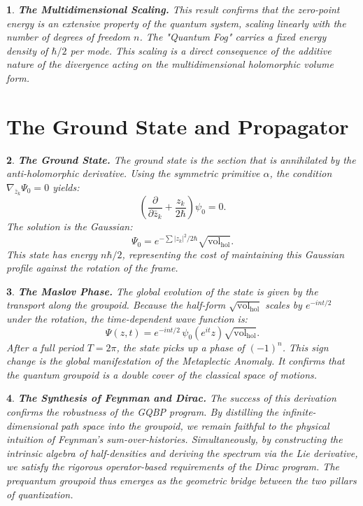\documentclass[11pt,reqno,letterpaper,twoside]{amsart}
\theoremstyle{articlestyle}
\newtheorem{article}{}
\theoremstyle{plain}
\theoremstyle{definition}
\def\artlabel[#1]{\textbf{#1.}}
\newcommand{\0}{\hat{0}}
\newcommand{\1}{\hat{1}}
\newcommand{\hol}{\mathrm{hol}}
\newcommand{\vol}{\mathrm{vol}}
\begin{document}
  \begin{article}\artlabel[The Multidimensional Scaling]
    This result confirms that the zero-point energy is an extensive property
    of the quantum system,
    scaling linearly with the number of degrees of freedom $n$.
    The "Quantum Fog" carries a fixed energy density of $\hbar/2$ per mode.
    This scaling is a direct consequence of the additive nature of the divergence 
    acting on the multidimensional holomorphic volume form.
  \end{article}
  
  
  \section{\textbf{The Ground State and Propagator}}
  \label{sec:GroundState}
  
  \begin{article}\artlabel[The Ground State]
    The ground state is the section that is annihilated by the anti-holomorphic derivative.
    Using the symmetric primitive $\alpha$, the condition $\nabla_{\bar{z}_k} \Psi_0 = 0$ yields:
    $$
      \left( \frac{\partial}{\partial \bar{z}_k} + \frac{z_k}{2\hbar} \right) \psi_0 = 0.
      $$
    The solution is the Gaussian:
    $$
      \Psi_0 = e^{-\sum |z_k|^2/2\hbar} \sqrt{\vol_{\hol}}.
      $$
    This state has energy $n\hbar/2$, representing the cost of maintaining this Gaussian profile 
    against the rotation of the frame.
  \end{article}
  
  \begin{article}\artlabel[The Maslov Phase]
    The global evolution of the state is given by the transport along the groupoid.
    Because the half-form $\sqrt{\vol_{\hol}}$ scales by $e^{-int/2}$ under the rotation,
    the time-dependent wave function is:
    $$
      \Psi(z, t) = e^{-int/2} \, \psi_0(e^{it} z) \sqrt{\vol_{\hol}}.
      $$
    After a full period $T=2\pi$, the state picks up a phase of $(-1)^n$.
    This sign change is the global manifestation of the Metaplectic Anomaly.
    It confirms that the quantum groupoid is a double cover of the classical space of motions.
  \end{article}
  
  \begin{article}\artlabel[The Synthesis of Feynman and Dirac]
    The success of this derivation confirms the robustness of the GQBP program.
    By distilling the infinite-dimensional path space into the groupoid,
    we remain faithful to the physical intuition of Feynman's sum-over-histories.
    Simultaneously,
    by constructing the intrinsic algebra of half-densities
    and deriving the spectrum via the Lie derivative,
    we satisfy the rigorous operator-based requirements of the Dirac program.
    The prequantum groupoid thus emerges as the geometric bridge
    between the two pillars of quantization.
  \end{article}
  
\end{document}
